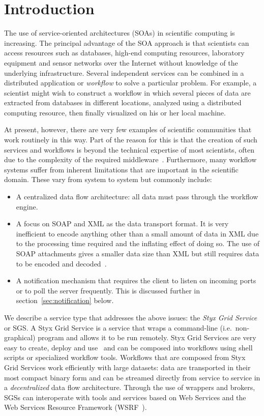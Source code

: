 \documentclass[a4paper]{article}
\begin{document}
\section{Introduction}\label{sec:intro}
The use of service-oriented architectures (SOAs) in scientific computing is increasing.  The principal advantage of the SOA approach is that scientists can access resources such as databases, high-end computing resources, laboratory equipment and sensor networks over the Internet without knowledge of the underlying infrastructure.  Several independent services can be combined in a distributed application or \textit{workflow\/} to solve a particular problem.  For example, a scientist might wish to construct a workflow in which several pieces of data are extracted from databases in different locations, analyzed using a distributed computing resource, then finally visualized on his or her local machine.

At present, however, there are very few examples of scientific communities that work routinely in this way.  Part of the reason for this is that the creation of such services and workflows is beyond the technical expertise of most scientists, often due to the complexity of the required middleware~\cite{chin:2004}.  Furthermore, many workflow systems suffer from inherent limitations that are important in the scientific domain.  These vary from system to system but commonly include:

\begin{itemize}
\item A centralized data flow architecture: all data must pass through the workflow engine.
\item A focus on SOAP and XML as the data transport format.  It is very inefficient to encode anything other than a small amount of data in XML due to the processing time required and the inflating effect of doing so.  The use of SOAP attachments gives a smaller data size than XML but still requires data to be encoded and decoded~\cite{bustamente:2000, chiu:2002, davis:2002}.
\item A notification mechanism that requires the client to listen on incoming ports or to poll the server frequently.  This is discussed further in section~\ref{sec:notification} below.
\end{itemize}

We describe a service type that addresses the above issues: the \textit{Styx Grid Service} or SGS.  A Styx Grid Service is a service that wraps a command-line (i.e.\ non-graphical) program and allows it to be run remotely.  Styx Grid Services are very easy to create, deploy and use~\cite{blower:2005, blower_lncs:2006, blower_escience:2006} and can be composed into workflows using shell scripts or specialized workflow tools.  Workflows that are composed from Styx Grid Services work efficiently with large datasets: data are transported in their most compact binary form and can be streamed directly from service to service in a \textit{decentralized} data flow architecture.  Through the use of wrappers and brokers, SGSs can interoperate with tools and services based on Web Services and the Web Services Resource Framework (WSRF~\cite{WSRF}).
\end{document}
